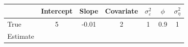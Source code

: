 \begin{tabular}{lcccccc}
\toprule
& Intercept & Slope & Covariate & $\sigma_\varepsilon^2$ & $\phi$ & $\sigma_\eta^2$ \\
\midrule
True & 5 & -0.01 & 2 & 1 & 0.9 & 1 \\
Estimate &       &       &       &       &       &       \\
\bottomrule
\end{tabular}
